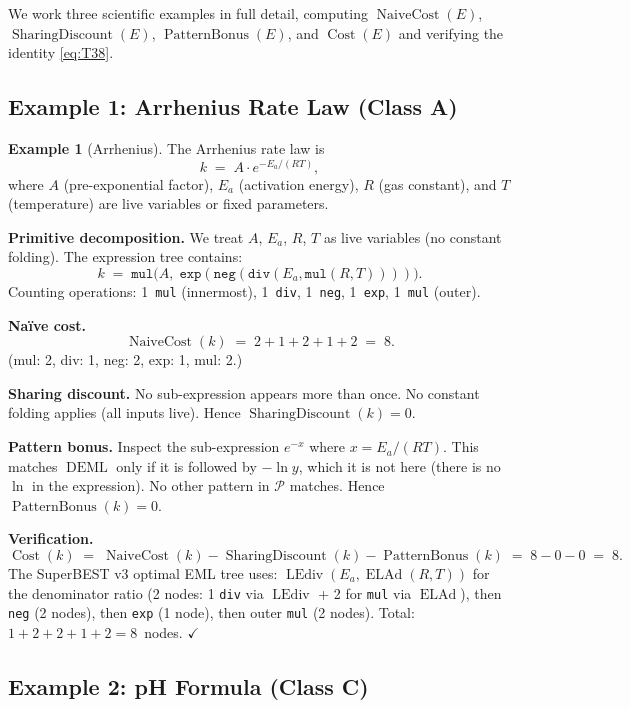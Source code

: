 \documentclass[12pt,a4paper]{article}
\theoremstyle{definition}
\newtheorem{example}[theorem]{Example}
\newcommand{\DEML}{\operatorname{DEML}}
\newcommand{\ELAd}{\operatorname{ELAd}}
\newcommand{\LEdiv}{\operatorname{LEdiv}}
\newcommand{\Cost}{\operatorname{Cost}}
\newcommand{\NC}{\operatorname{NaiveCost}}
\newcommand{\SD}{\operatorname{SharingDiscount}}
\newcommand{\PB}{\operatorname{PatternBonus}}
\begin{document}
We work three scientific examples in full detail, computing $\NC(E)$,
$\SD(E)$, $\PB(E)$, and $\Cost(E)$ and verifying the identity \eqref{eq:T38}.

\subsection{Example 1: Arrhenius Rate Law (Class A)}

\begin{example}[Arrhenius]
\label{ex:arrhenius}
The Arrhenius rate law is
\[
  k \;=\; A \cdot e^{-E_a / (RT)},
\]
where $A$ (pre-exponential factor), $E_a$ (activation energy), $R$ (gas
constant), and $T$ (temperature) are live variables or fixed parameters.

\textbf{Primitive decomposition.}
We treat $A$, $E_a$, $R$, $T$ as live variables (no constant folding).
The expression tree contains:
\[
  k \;=\; \texttt{mul}\bigl(A,\; \texttt{exp}(\texttt{neg}(\texttt{div}(E_a, \texttt{mul}(R,T))))\bigr).
\]
Counting operations: 1~\texttt{mul} (innermost), 1~\texttt{div},
1~\texttt{neg}, 1~\texttt{exp}, 1~\texttt{mul} (outer).

\textbf{Na\"{i}ve cost.}
\[
  \NC(k) \;=\; 2 + 1 + 2 + 1 + 2 \;=\; 8.
\]
(mul: 2, div: 1, neg: 2, exp: 1, mul: 2.)

\textbf{Sharing discount.}
No sub-expression appears more than once.  No constant folding applies (all
inputs live).  Hence $\SD(k) = 0$.

\textbf{Pattern bonus.}
Inspect the sub-expression $e^{-x}$ where $x = E_a/(RT)$.  This matches
$\DEML$ only if it is followed by $-\ln y$, which it is not here (there is no
$\ln$ in the expression).  No other pattern in $\mathcal{P}$ matches.
Hence $\PB(k) = 0$.

\textbf{Verification.}
\[
  \Cost(k) \;=\; \NC(k) - \SD(k) - \PB(k) \;=\; 8 - 0 - 0 \;=\; 8.
\]
The SuperBEST v3 optimal EML tree uses: $\LEdiv(E_a, \ELAd(R,T))$ for the
denominator ratio (2 nodes: 1 \texttt{div} via $\LEdiv$ + 2 for \texttt{mul}
via $\ELAd$), then \texttt{neg} (2 nodes), then \texttt{exp} (1 node), then
outer \texttt{mul} (2 nodes).  Total: $1 + 2 + 2 + 1 + 2 = 8$~nodes.
\hfill$\checkmark$
\end{example}

\subsection{Example 2: pH Formula (Class C)}
\end{document}
